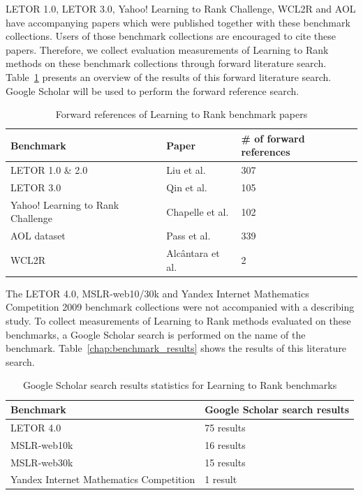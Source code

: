 LETOR 1.0, LETOR 3.0, Yahoo! Learning to Rank Challenge, WCL2R and AOL have accompanying papers which were published together with these benchmark collections. Users of those benchmark collections are encouraged to cite these papers. Therefore, we collect evaluation measurements of Learning to Rank methods on these benchmark collections through forward literature search. Table~\ref{tbl:ltr_benchmark_forref} presents an overview of the results of this forward literature search. Google Scholar will be used to perform the forward reference search.

\begin{table}[!h]
\begin{tabular}{l|l|l}
Benchmark & Paper & \# of forward references \\
\hline
LETOR 1.0 \& 2.0 & Liu et al. \cite{Liu2007b} & 307\\
LETOR 3.0 & Qin et al. \cite{Qin2010} & 105\\
Yahoo! Learning to Rank Challenge & Chapelle et al. \cite{Chapelle2011a} & 102\\
AOL dataset & Pass et al. \cite{Pass2006} & 339\\
WCL2R & Alc{\^a}ntara et al. \cite{Alcantara2010} & 2\\
\end{tabular}
\caption{Forward references of Learning to Rank benchmark papers}
\label{tbl:ltr_benchmark_forref}
\end{table}

The LETOR 4.0, MSLR-web10/30k and Yandex Internet Mathematics Competition 2009 benchmark collections were not accompanied with a describing study. To collect measurements of Learning to Rank methods evaluated on these benchmarks, a Google Scholar search is performed on the name of the benchmark. Table~\ref{chap:benchmark_results} shows the results of this literature search.

\begin{table}[!h]
\begin{tabular}{l|l}
Benchmark & Google Scholar search results \\
\hline
LETOR 4.0 & 75 results \\
MSLR-web10k & 16 results \\
MSLR-web30k & 15 results \\
Yandex Internet Mathematics Competition & 1 result \\ 
\end{tabular}
\caption{Google Scholar search results statistics for Learning to Rank benchmarks}
\label{tbl:ltr_benchmark_searchres}
\end{table}

